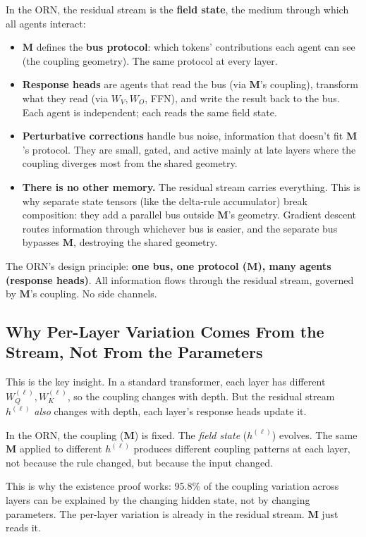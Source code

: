 \documentclass[11pt, a4paper]{article}
\newcommand{\M}{\mathbf{M}}
\theoremstyle{remark}
\begin{document}
In the ORN, the residual stream is the \textbf{field state}, the medium through which all agents interact:

\begin{itemize}[nosep]
    \item $\M$ defines the \textbf{bus protocol}: which tokens' contributions each agent can see (the coupling geometry).
    The same protocol at every layer.
    \item \textbf{Response heads} are agents that read the bus (via $\M$'s coupling), transform what they read (via $W_V, W_O$, FFN), and write the result back to the bus.
    Each agent is independent; each reads the same field state.
    \item \textbf{Perturbative corrections} handle bus noise, information that doesn't fit $\M$'s protocol.
    They are small, gated, and active mainly at late layers where the coupling diverges most from the shared geometry.
    \item \textbf{There is no other memory.}
    The residual stream carries everything.
    This is why separate state tensors (like the delta-rule accumulator) break composition: they add a parallel bus outside $\M$'s geometry.
    Gradient descent routes information through whichever bus is easier, and the separate bus bypasses $\M$, destroying the shared geometry.
\end{itemize}

The ORN's design principle: \textbf{one bus, one protocol ($\M$), many agents (response heads)}.
All information flows through the residual stream, governed by $\M$'s coupling.
No side channels.

\subsection{Why Per-Layer Variation Comes From the Stream, Not From the Parameters}

This is the key insight.
In a standard transformer, each layer has different $W_Q^{(\ell)}, W_K^{(\ell)}$, so the coupling changes with depth.
But the residual stream $h^{(\ell)}$ \emph{also} changes with depth, each layer's response heads update it.

In the ORN, the coupling ($\M$) is fixed.
The \emph{field state} ($h^{(\ell)}$) evolves.
The same $\M$ applied to different $h^{(\ell)}$ produces different coupling patterns at each layer, not because the rule changed, but because the input changed.

This is why the existence proof works: 95.8\% of the coupling variation across layers can be explained by the changing hidden state, not by changing parameters.
The per-layer variation is already in the residual stream.
$\M$ just reads it.
\end{document}
